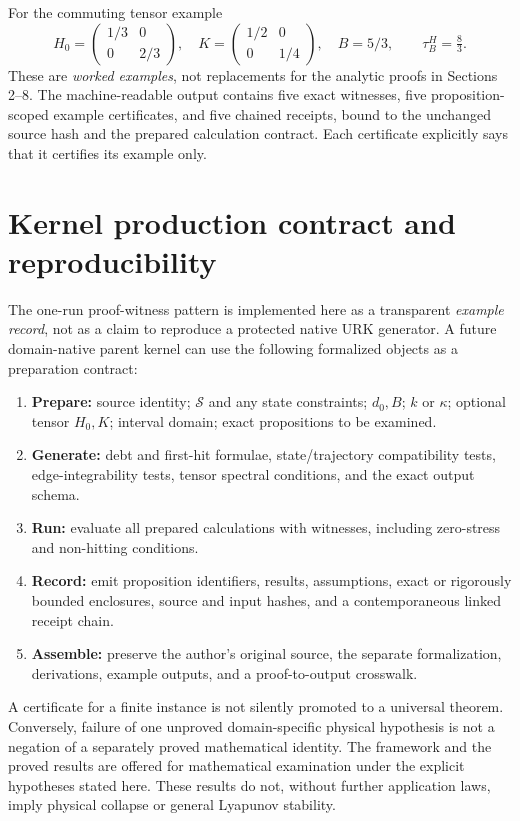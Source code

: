 \documentclass[11pt,letterpaper]{article}
\theoremstyle{definition}\newtheorem{definition}[theorem]{Definition}\newtheorem{example}[theorem]{Example}
\theoremstyle{remark}\newtheorem{remark}[theorem]{Remark}
\begin{document}
For the commuting tensor example
\begin{equation}\label{eq:tensorex}
H_0=\begin{pmatrix}1/3&0\\0&2/3\end{pmatrix},\quad
K=\begin{pmatrix}1/2&0\\0&1/4\end{pmatrix},\quad B=5/3,
\qquad\tau_B^H=\boxed{\tfrac83}.
\end{equation}
These are \emph{worked examples}, not replacements for the analytic proofs in Sections 2--8. The machine-readable output contains five exact witnesses, five proposition-scoped example certificates, and five chained receipts, bound to the unchanged source hash and the prepared calculation contract. Each certificate explicitly says that it certifies its example only.

\section{Kernel production contract and reproducibility}
The one-run proof-witness pattern is implemented here as a transparent \emph{example record}, not as a claim to reproduce a protected native URK generator. A future domain-native parent kernel can use the following formalized objects as a preparation contract:
\begin{enumerate}
\item \textbf{Prepare:} source identity; $\mathcal S$ and any state constraints; $d_0,B$; $k$ or $\kappa$; optional tensor $H_0,K$; interval domain; exact propositions to be examined.
\item \textbf{Generate:} debt and first-hit formulae, state/trajectory compatibility tests, edge-integrability tests, tensor spectral conditions, and the exact output schema.
\item \textbf{Run:} evaluate all prepared calculations with witnesses, including zero-stress and non-hitting conditions.
\item \textbf{Record:} emit proposition identifiers, results, assumptions, exact or rigorously bounded enclosures, source and input hashes, and a contemporaneous linked receipt chain.
\item \textbf{Assemble:} preserve the author's original source, the separate formalization, derivations, example outputs, and a proof-to-output crosswalk.
\end{enumerate}
A certificate for a finite instance is not silently promoted to a universal theorem. Conversely, failure of one unproved domain-specific physical hypothesis is not a negation of a separately proved mathematical identity. The framework and the proved results are offered for mathematical examination under the explicit hypotheses stated here. These results do not, without further application laws, imply physical collapse or general Lyapunov stability.
\end{document}
